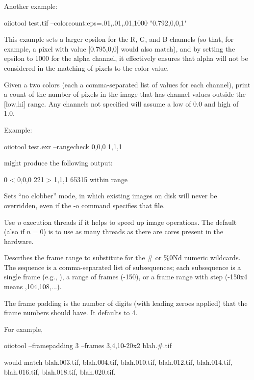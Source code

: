 \noindent Another example:

\begin{code}
    oiiotool test.tif --colorcount:eps=.01,.01,.01,1000 "0.792,0,0,1"
\end{code}

\noindent This example sets a larger epsilon for the R, G, and B 
channels (so that, for example, a pixel with value [0.795,0,0] would
also match), and by setting the epsilon to 1000 for the alpha channel,
it effectively ensures that alpha will not be considered in the matching
of pixels to the color value.
\apiend

Given a two colors (each a comma-separated list of values for each
channel), print a count of the number of pixels in the image that has
channel values outside the [low,hi] range.  Any channels not
specified will assume a low of 0.0 and high of 1.0.

\noindent Example:

\begin{code}
    oiiotool test.exr --rangecheck 0,0,0 1,1,1
\end{code}
\noindent might produce the following output:
\begin{code}
     0  < 0,0,0
   221  > 1,1,1
 65315  within range
\end{code}
\apiend

Sets ``no clobber'' mode, in which existing images on disk will never be 
overridden, even if the {\cf -o} command specifies that file.
\apiend

Use \emph{n} execution threads if it helps to speed up image operations.
The default (also if $n=0$) is to use as many threads as there are cores
present in the hardware.
\apiend

Describes the frame range to substitute for the {\cf \#} or {\cf \%0Nd} 
numeric wildcards.  The
sequence is a comma-separated list of subsequences; each subsequence
is a single frame (e.g., {}), a range of frames ({-150}),
or a frame range with step ({-150x4} means {,104,108,...}).

The frame padding is the number of digits (with leading zeroes applied)
that the frame numbers should have.  It defaults to 4.

For example,
\begin{code}
    oiiotool --framepadding 3 --frames 3,4,10-20x2 blah.#.tif
\end{code}
\noindent would match {\cf blah.003.tif}, {\cf blah.004.tif},
{\cf blah.010.tif}, {\cf blah.012.tif}, 
{\cf blah.014.tif}, {\cf blah.016.tif}, {\cf blah.018.tif}, 
{\cf blah.020.tif}.
\apiend

